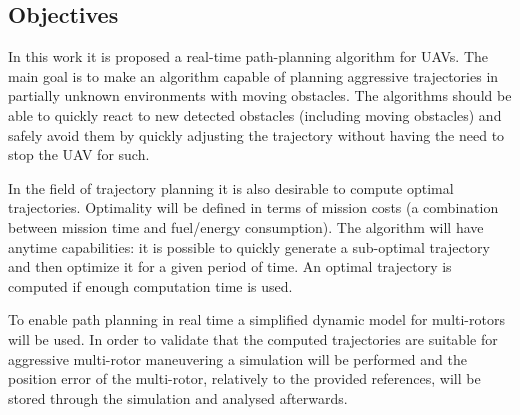 \subsection{Objectives}
In this work it is proposed a real-time path-planning algorithm for UAVs. The main goal is to make an algorithm capable of planning aggressive trajectories in partially unknown environments with moving obstacles. The algorithms should be able to quickly react to new detected obstacles (including moving obstacles) and safely avoid them by quickly adjusting the trajectory without having the need to stop the UAV for such.
\par
In the field of trajectory planning it is also desirable to compute optimal trajectories. Optimality will be defined in terms of mission costs (a combination between mission time and fuel/energy consumption). The algorithm will have anytime capabilities: it is possible to quickly generate a sub-optimal trajectory and then optimize it for a given period of time. An optimal trajectory is computed if enough computation time is used.
\par
To enable path planning in real time a simplified dynamic model for multi-rotors will be used. In order to validate that the computed trajectories are suitable for aggressive multi-rotor maneuvering a simulation will be performed and the position error of the multi-rotor, relatively to the provided references, will be stored through the simulation and analysed afterwards.


